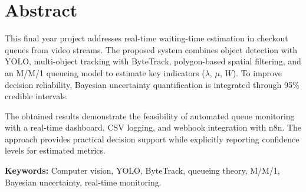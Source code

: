 \chapter*{Abstract}

This final year project addresses real-time waiting-time estimation in checkout queues from video streams.
The proposed system combines object detection with YOLO, multi-object tracking with ByteTrack, polygon-based spatial filtering, and an M/M/1 queueing model to estimate key indicators ($\lambda$, $\mu$, $W$).
To improve decision reliability, Bayesian uncertainty quantification is integrated through 95\% credible intervals.

The obtained results demonstrate the feasibility of automated queue monitoring with a real-time dashboard, CSV logging, and webhook integration with n8n.
The approach provides practical decision support while explicitly reporting confidence levels for estimated metrics.

\vspace{0.5cm}
\noindent\textbf{Keywords:} Computer vision, YOLO, ByteTrack, queueing theory, M/M/1, Bayesian uncertainty, real-time monitoring.

